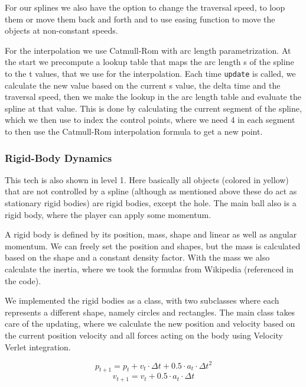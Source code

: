 \documentclass{article}
\begin{document}
For our splines we also have the option to change the traversal speed, to loop them or move them back and forth and 
to use easing function to move the objects at non-constant speeds.

For the interpolation we use Catmull-Rom with arc length parametrization. At the start 
we precompute a lookup table that maps the arc length s of the spline to the t values, that we use for the interpolation.
Each time \texttt{update} is called, we calculate the new value based on the current s value, the delta time and the traversal speed, then we make the 
lookup in the arc length table and evaluate the spline at that value. This is done by 
calculating the current segment of the spline, which we then use to index the control points, where we need 4 in each segment
to then use the Catmull-Rom interpolation formula to get a new point.

\subsubsection{Rigid-Body Dynamics}

This tech is also shown in level 1. Here basically all objects (colored in yellow) that are not controlled by a spline (although as mentioned above these do act as stationary rigid bodies) are rigid bodies, except the hole.
The main ball also is a rigid body, where the player can apply some momentum. 

A rigid body is defined by its position, mass, shape and linear as well as angular momentum. 
We can freely set the position and shapes, but the mass is calculated based on the shape and a constant density factor.
With the mass we also calculate the inertia, where we took the formulas from Wikipedia (referenced in the code).

We implemented the rigid bodies as a class, with two subclasses where each represents a different shape, namely circles and rectangles.
The main class takes care of the updating, where we calculate the new position and velocity
based on the current position velocity and all forces acting on the body using Velocity Verlet integration. 

\[
    p_{t+1} = p_{t} + v_{t} \cdot \Delta t + 0.5 \cdot a_{t} \cdot \Delta t^2 
\]
\[
    v_{t+1} = v_{t} + 0.5 \cdot a_{t} \cdot \Delta t
\]
\end{document}
